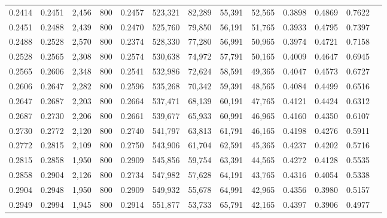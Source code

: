 \begin{tabular}{rrrrrrrrrrrrr}
0.2414 & 0.2451 &  2,456 &   800 &                                     0.2457 & 523,321 &  82,289 &  55,391 &  52,565 & 0.3898 & 0.4869 & 0.7622 \\
0.2451 & 0.2488 &  2,439 &   800 &                                     0.2470 & 525,760 &  79,850 &  56,191 &  51,765 & 0.3933 & 0.4795 & 0.7397 \\
0.2488 & 0.2528 &  2,570 &   800 &                                     0.2374 & 528,330 &  77,280 &  56,991 &  50,965 & 0.3974 & 0.4721 & 0.7158 \\
0.2528 & 0.2565 &  2,308 &   800 &                                     0.2574 & 530,638 &  74,972 &  57,791 &  50,165 & 0.4009 & 0.4647 & 0.6945 \\
0.2565 & 0.2606 &  2,348 &   800 &                                     0.2541 & 532,986 &  72,624 &  58,591 &  49,365 & 0.4047 & 0.4573 & 0.6727 \\
0.2606 & 0.2647 &  2,282 &   800 &                                     0.2596 & 535,268 &  70,342 &  59,391 &  48,565 & 0.4084 & 0.4499 & 0.6516 \\
0.2647 & 0.2687 &  2,203 &   800 &                                     0.2664 & 537,471 &  68,139 &  60,191 &  47,765 & 0.4121 & 0.4424 & 0.6312 \\
0.2687 & 0.2730 &  2,206 &   800 &                                     0.2661 & 539,677 &  65,933 &  60,991 &  46,965 & 0.4160 & 0.4350 & 0.6107 \\
0.2730 & 0.2772 &  2,120 &   800 &                                     0.2740 & 541,797 &  63,813 &  61,791 &  46,165 & 0.4198 & 0.4276 & 0.5911 \\
0.2772 & 0.2815 &  2,109 &   800 &                                     0.2750 & 543,906 &  61,704 &  62,591 &  45,365 & 0.4237 & 0.4202 & 0.5716 \\
0.2815 & 0.2858 &  1,950 &   800 &                                     0.2909 & 545,856 &  59,754 &  63,391 &  44,565 & 0.4272 & 0.4128 & 0.5535 \\
0.2858 & 0.2904 &  2,126 &   800 &                                     0.2734 & 547,982 &  57,628 &  64,191 &  43,765 & 0.4316 & 0.4054 & 0.5338 \\
0.2904 & 0.2948 &  1,950 &   800 &                                     0.2909 & 549,932 &  55,678 &  64,991 &  42,965 & 0.4356 & 0.3980 & 0.5157 \\
0.2949 & 0.2994 &  1,945 &   800 &                                     0.2914 & 551,877 &  53,733 &  65,791 &  42,165 & 0.4397 & 0.3906 & 0.4977 \\

\end{tabular}
